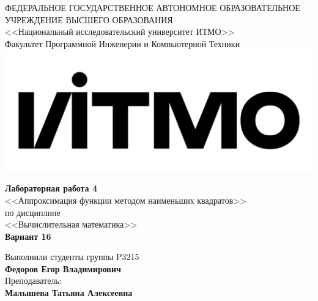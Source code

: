 \begin{titlepage}
	\thispagestyle{firststyle}
	\begin{center}
		ФЕДЕРАЛЬНОЕ ГОСУДАРСТВЕННОЕ АВТОНОМНОЕ ОБРАЗОВАТЕЛЬНОЕ УЧРЕЖДЕНИЕ ВЫСШЕГО ОБРАЗОВАНИЯ\\
		\vspace{0.5cm}
		<<Национальный исследовательский университет ИТМО>>\\
		Факультет Программной Инженерии и Компьютерной Техники \\
		\vspace{1cm}
		\includegraphics[scale=0.1]{img/itmo_logo.png}
	\end{center}

	\vspace{1cm}

	\begin{center}
		\large
    \textbf{Лабораторная работа \textnumero{} 4}\\
		<<Аппроксимация функции методом наименьших квадратов>> \\
		по дисциплине\\
		<<Вычислительная математика>> \\
    \textbf{Вариант \textnumero{} 16}
	\end{center}

	\vspace{2cm}

	\begin{flushright}
		Выполнили студенты  группы P3215\\
		\textbf{Федоров Егор Владимирович} \\
		Преподаватель: \\
		\textbf{Малышева Татьяна Алексеевна}\\
	\end{flushright}

\end{titlepage}
